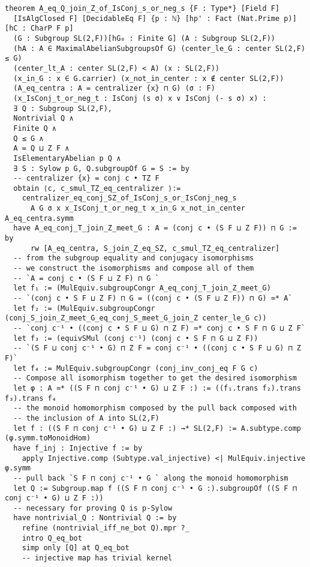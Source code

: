 \begin{tiny}
\begin{verbatim}
theorem A_eq_Q_join_Z_of_IsConj_s_or_neg_s {F : Type*} [Field F]
  [IsAlgClosed F] [DecidableEq F] {p : ℕ} [hp' : Fact (Nat.Prime p)] [hC : CharP F p]
  (G : Subgroup SL(2,F))[hG₀ : Finite G] (A : Subgroup SL(2,F))
  (hA : A ∈ MaximalAbelianSubgroupsOf G) (center_le_G : center SL(2,F) ≤ G)
  (center_lt_A : center SL(2,F) < A) (x : SL(2,F))
  (x_in_G : x ∈ G.carrier) (x_not_in_center : x ∉ center SL(2,F))
  (A_eq_centra : A = centralizer {x} ⊓ G) (σ : F)
  (x_IsConj_t_or_neg_t : IsConj (s σ) x ∨ IsConj (- s σ) x) :
  ∃ Q : Subgroup SL(2,F),
  Nontrivial Q ∧
  Finite Q ∧
  Q ≤ G ∧
  A = Q ⊔ Z F ∧
  IsElementaryAbelian p Q ∧
  ∃ S : Sylow p G, Q.subgroupOf G = S := by
  -- centralizer {x} = conj c • TZ F
  obtain ⟨c, c_smul_TZ_eq_centralizer ⟩:=
    centralizer_eq_conj_SZ_of_IsConj_s_or_IsConj_neg_s
      A G σ x x_IsConj_t_or_neg_t x_in_G x_not_in_center A_eq_centra.symm
  have A_eq_conj_T_join_Z_meet_G : A = (conj c • (S F ⊔ Z F)) ⊓ G := by
      rw [A_eq_centra, S_join_Z_eq_SZ, c_smul_TZ_eq_centralizer]
  -- from the subgroup equality and conjugacy isomorphisms
  -- we construct the isomorphisms and compose all of them
  -- `A = conj c • (S F ⊔ Z F) ⊓ G `
  let f₁ := (MulEquiv.subgroupCongr A_eq_conj_T_join_Z_meet_G)
  -- `(conj c • S F ⊔ Z F) ⊓ G = ((conj c • (S F ⊔ Z F)) ⊓ G) ≃* A`
  let f₂ := (MulEquiv.subgroupCongr (conj_S_join_Z_meet_G_eq_conj_S_meet_G_join_Z center_le_G c))
  -- `conj c⁻¹ • ((conj c • S F ⊔ G) ⊓ Z F) ≃* conj c • S F ⊓ G ⊔ Z F`
  let f₃ := (equivSMul (conj c⁻¹) (conj c • S F ⊓ G ⊔ Z F))
  -- `(S F ⊔ conj c⁻¹ • G) ⊓ Z F = conj c⁻¹ • ((conj c • S F ⊔ G) ⊓ Z F)`
  let f₄ := MulEquiv.subgroupCongr (conj_inv_conj_eq F G c)
  -- Compose all isomorphism together to get the desired isomorphism
  let φ : A ≃* ((S F ⊓ conj c⁻¹ • G) ⊔ Z F :) := ((f₁.trans f₂).trans f₃).trans f₄
  -- the monoid homomorphism composed by the pull back composed with
  -- the inclusion of A into SL(2,F)
  let f : ((S F ⊓ conj c⁻¹ • G) ⊔ Z F :) →* SL(2,F) := A.subtype.comp (φ.symm.toMonoidHom)
  have f_inj : Injective f := by
    apply Injective.comp (Subtype.val_injective) <| MulEquiv.injective φ.symm
  -- pull back `S F ⊓ conj c⁻¹ • G ` along the monoid homomorphism
  let Q := Subgroup.map f ((S F ⊓ conj c⁻¹ • G :).subgroupOf ((S F ⊓ conj c⁻¹ • G) ⊔ Z F :))
  -- necessary for proving Q is p-Sylow
  have nontrivial_Q : Nontrivial Q := by
    refine (nontrivial_iff_ne_bot Q).mpr ?_
    intro Q_eq_bot
    simp only [Q] at Q_eq_bot
    -- injective map has trivial kernel

\end{verbatim}
\end{tiny}
